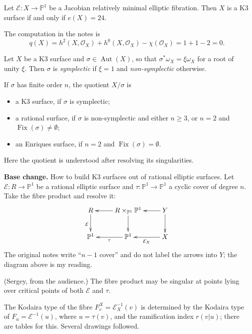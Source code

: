 \begin{proposition}
\label{proposition-zingali-euler-24}
Let $\mathcal{E}\colon X\to\mathbb{P}^1$ be
a Jacobian relatively minimal elliptic
fibration. Then $X$ is a K3 surface if and
only if $e(X)=24$.
\end{proposition}

The computation in the notes is
$$
q(X)=h^2(X,\mathcal{O}_X)
+h^0(X,\mathcal{O}_X)-\chi(\mathcal{O}_X)
=1+1-2=0.
$$

\begin{definition}
\label{definition-zingali-non-symplectic}
Let $X$ be a K3 surface and
$\sigma\in\operatorname{Aut}(X)$, so that
$\sigma^*\omega_X=\xi\omega_X$ for a root of
unity $\xi$. Then $\sigma$ is
\emph{symplectic} if $\xi=1$ and
\emph{non-symplectic} otherwise.
\end{definition}

If $\sigma$ has finite order $n$, the
quotient $X/\sigma$ is
\begin{itemize}
\item a K3 surface, if $\sigma$ is
symplectic;
\item a rational surface, if $\sigma$ is
non-symplectic and either $n\geq 3$, or
$n=2$ and $\operatorname{Fix}(\sigma)\neq
\emptyset$;
\item an Enriques surface, if $n=2$ and
$\operatorname{Fix}(\sigma)=\emptyset$.
\end{itemize}
Here the quotient is understood after
resolving its singularities.

\medskip\noindent
{\bf Base change.} How to build K3 surfaces
out of rational elliptic surfaces. Let
$\mathcal{E}\colon R\to\mathbb{P}^1$ be a
rational elliptic surface and
$\tau\colon\mathbb{P}^1\to\mathbb{P}^1$ a
cyclic cover of degree $n$. Take the fibre
product and resolve it:
$$
\xymatrix{
R \ar[d]_{\mathcal{E}}
& R\times_{\mathbb{P}^1}\mathbb{P}^1
\ar[l] \ar[d] & Y \ar[l] \ar[d] \\
\mathbb{P}^1 & \mathbb{P}^1 \ar[l]^{\tau}
& X \ar[l]^{\mathcal{E}_X}
}
$$
The original notes write ``$n-1$ cover'' and
do not label the arrows into $Y$; the
diagram above is my reading.

\begin{remark}
\label{remark-zingali-sergey}
(Sergey, from the audience.) The fibre
product may be singular at points lying over
critical points of both $\mathcal{E}$ and
$\tau$.
\end{remark}

The Kodaira type of the fibre
$F^X_v=\mathcal{E}_X^{-1}(v)$ is determined
by the Kodaira type of
$F_u=\mathcal{E}^{-1}(u)$, where
$u=\tau(v)$, and the ramification index
$r(v|u)$; there are tables for this. Several
drawings followed.

